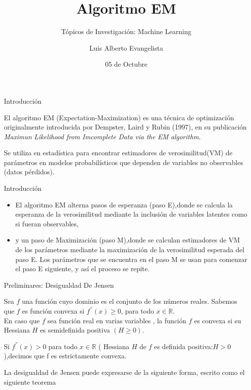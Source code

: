 \documentclass[utf8,spanish,xcolor={table,dvipsnames},12pt]{beamer}
\title[Algoritmo EM]{Algoritmo  EM}
\subtitle{T\'opicos de Investigaci\'on: Machine Learning}
\author{Luis Alberto Evangelista}
\institute[UNI]{Universidad Nacional de Ingeniería}
\date{05 de Octubre}
\begin{document}
\begin{frame}
\maketitle
\end{frame}

\begin{frame}{Introducción}

 El algoritmo EM (Expectation-Maximization) es una técnica de optimización originalmente introducida por Dempster, Laird y Rubin (1997), en su publicación \textit{Maximun Likelihood from Imcomplete Data via the EM algorithm}. 
 
 \vspace{0.4cm}
 
 Se utiliza en estad\'istica para encontrar estimadores de verosimilitud(VM) de parámetros en modelos probabilísticos que dependen de variables no observables (datos pérdidos).
\end{frame}

\begin{frame}{Introducción}
 \begin{itemize}
   \item El algoritmo EM alterna pasos de esperanza (paso E),donde se calcula la esperanza de la verosimilitud mediante la inclusión de variables latentes como si fueran observables,   
   \item y un paso de Maximización (paso M),donde se calculan estimadores de VM de los parámetros mediante la maximización de la verosimilitud esperada del paso E.
       Los parámetros que se encuentra en el paso M se usan para comenzar el paso E siguiente, y así el proceso se repite.
 \end{itemize}

 \end{frame}


\begin{frame}{Preliminares: Desigualdad De Jensen}

Sea $f$ una función cuyo dominio es el conjunto de los números reales. Sabemos que $f$ es función convexa si $f^{''}(x)\geq 0$, para todo $x\in \mathds{R}$.\\

 En caso que $f$ sea  función real en varias variables , la función $f$ es convexa si su Hessiana $H$ es semidefinida positiva $(H\geq 0)$.\\

\vspace{0.2cm}


 Si $f^{''}(x)>0$ para todo $x\in \mathds{R}$ ( Hessiana $H$ de $f$ es definida positiva:$H>0$),decimos que f es estrictamente convexa.\\
 
 \vspace{0.2cm}
 
 La desigualdad de Jensen puede expresarse de la siguiente forma, escrito como el siguiente teorema
\end{frame}
\end{document}
